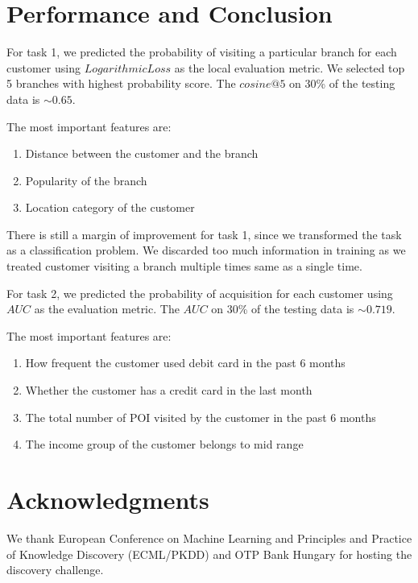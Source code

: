 \documentclass[a4paper]{llncs}
\begin{document}
\section{Performance and Conclusion}
For task 1, we predicted the probability of visiting a particular branch for each customer using $Logarithmic Loss$ as the local evaluation metric.
 We selected top 5 branches with highest probability score. The $cosine@5$ on 30\% of the testing data is $\sim0.65$.

The most important features are:

\begin{enumerate}
 \item Distance between the customer and the branch
 \item Popularity of the branch
 \item Location category of the customer

\end{enumerate}

There is still a margin of improvement for task 1, since we transformed the task as a classification problem.
 We discarded too much information in training as we treated customer visiting a branch multiple times same as a single time.

For task 2, we predicted the probability of acquisition for each customer using $AUC$ as the evaluation metric.
The $AUC$ on 30\% of the testing data is $\sim0.719$.

The most important features are:

\begin{enumerate}
 \item How frequent the customer used debit card in the past 6 months

 \item Whether the customer has a credit card in the last month

 \item The total number of POI visited by the customer in the past 6 months

 \item The income group of the customer belongs to mid range
\end{enumerate}

\section{Acknowledgments}
We thank European Conference on Machine Learning and Principles and Practice of Knowledge Discovery (ECML/PKDD)
and OTP Bank Hungary for hosting the discovery challenge.





\end{document}
